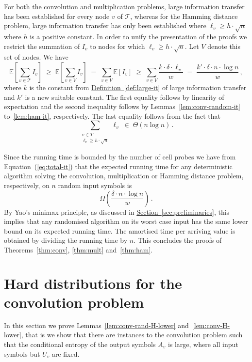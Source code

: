 \documentclass[11pt]{article}
\numberwithin{equation}{section}
\theoremstyle{definition}
\theoremstyle{plain}
\newcommand{\expref}[2]{\hyperref[#2]{#1~\ref{#2}}}
\newcommand{\calT}{\ensuremath{\mathcal{T}}}
\newcommand{\lit}{large information transfer\xspace}
\newcommand{\Xv}{\ensuremath{U_v}}
\newcommand{\Yv}{\ensuremath{A_v}}
\newcommand{\vit}{\ensuremath{I_v}}
\begin{document}
For both the convolution and multiplication problems, \lit has been established for every node $v$ of $\calT$, whereas for the Hamming distance problem, \lit has only been established where $\ell_v\geq h \cdot \sqrt{n}$ where $h$ is a positive constant.
In order to unify the presentation of the proofs we restrict the summation of $\vit$ to nodes for which $\ell_v\geq h \cdot \sqrt{n}$.
Let $V$ denote this set of nodes.
We have
\begin{equation}
\label{eq:total-it}
\mathbb{E}\left[\sum_{v\in\calT} \vit\right]
\;\geq\;
\mathbb{E}\left[\sum_{v\in V} \vit\right]
\;=\;
\sum_{v\in V} \mathbb{E}[\vit]
\;\geq\;
\sum_{v\in V} \frac{k\cdot\delta\cdot\ell_v}{w}
\;=\;
\frac{k'\cdot\delta\cdot n\cdot \log n}{w}\,,
\end{equation}
where $k$ is the constant from \expref{Definition}{def:large-it} of \lit and $k'$ is a new suitable constant.
The first equality follows by linearity of expectation and the second inequality follows by Lemmas~\ref{lem:conv-random-it} to~\ref{lem:ham-it}, respectively.
The last equality follows from the fact that
\[
\sum_{\substack{v\in T\\ \ell_v \geqslant h \cdot \sqrt{n}}} \ell_v \;\in\; \Theta(n\log n)\,.
\]

Since the running time is bounded by the number of cell probes we have from Equation~(\ref{eq:total-it}) that the expected running time for any deterministic algorithm solving the convolution, multiplication or Hamming distance problem, respectively, on $n$ random input symbols is
\[
\Omega\left(\frac{\delta\cdot n\cdot \log n}{w}\right)\,.
\]
By Yao's minimax principle, as discussed in \expref{Section}{sec:preliminaries}, this implies that any randomised algorithm on its worst case input has the same lower bound on its expected running time.
The amortised time per arriving value is obtained by dividing the running time by $n$.
This concludes the proofs of Theorems~\ref{thm:conv}, \ref{thm:mult} and~\ref{thm:ham}.



\section{Hard distributions for the convolution problem} \label{sec:conv}

In this section we prove Lemmas~\ref{lem:conv-rand-H-lower} and~\ref{lem:conv-H-lower}, that is we show that there are instances to the convolution problem such that the conditional entropy of the output symbols $\Yv$ is large, where all input symbols but $\Xv$ are fixed.
\end{document}

